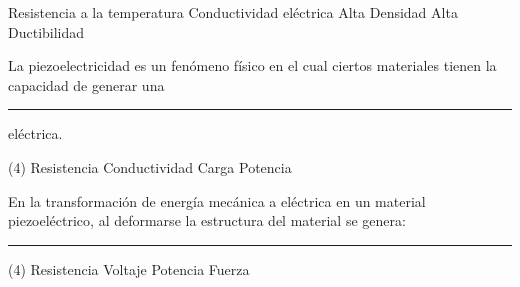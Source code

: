 \documentclass[12pt, letter]{exam}
\begin{document}
\begin{questions}
    \vspace{0.5cm}
    \begin{multicols}{2}
        \begin{tasks}
            \task Resistencia a la temperatura
            \task Conductividad eléctrica
            \task Alta Densidad
            \task Alta Ductibilidad
        \end{tasks}
    \end{multicols}
    \question La piezoelectricidad es un fenómeno físico en el cual ciertos materiales tienen la capacidad de generar una \rule{2cm}{0.1mm} eléctrica.
    \begin{tasks}(4)
        \task Resistencia
        \task Conductividad
        \task Carga
        \task Potencia
    \end{tasks}
    \question En la transformación de energía mecánica a eléctrica en un material piezoeléctrico, al deformarse la estructura del material se genera: \rule{2cm}{0.1mm}
    \begin{tasks}(4)
        \task Resistencia
        \task Voltaje
        \task Potencia
        \task Fuerza
    \end{tasks}
\end{questions}

\newpage
\end{document}
